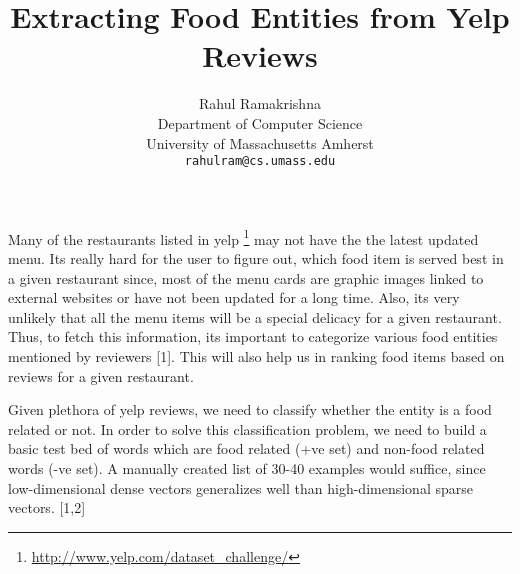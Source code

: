 \documentclass{article} %
\title{Extracting Food Entities from Yelp Reviews}
\author{
Rahul Ramakrishna \\
Department of Computer Science\\
University of Massachusetts Amherst\\
\texttt{rahulram@cs.umass.edu} \\
}
\begin{document}
\maketitle




Many of the restaurants listed in yelp \footnote{\url{http://www.yelp.com/dataset_challenge/}} may not have the the latest updated menu. Its really hard for the user to figure out, which food item is served best in a given restaurant since, most of the menu cards are graphic images linked to external websites or have not been updated for a long time. Also, its very unlikely that all the menu items will be a special delicacy for a given restaurant. Thus, to fetch this information, its important to categorize various food entities mentioned by reviewers [1]. This will also help us in ranking food items based on reviews for a given restaurant. 

Given plethora of yelp reviews, we need to classify whether the entity is a food related or not. In order to solve this classification problem, we need to build a basic test bed of words which are food related (+ve set) and non-food related words (-ve set). A manually created list of 30-40 examples would suffice, since low-dimensional dense vectors generalizes well than high-dimensional sparse vectors. [1,2]
\end{document}
